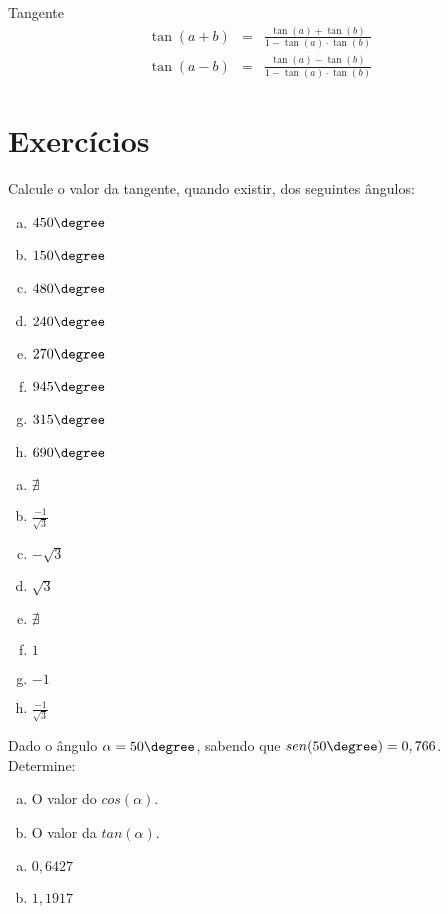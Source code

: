  Tangente
 \begin{eqnarray*}
  \tan(a+b)&=& \frac{\tan(a)+\tan(b)}{1-\tan(a)\cdot \tan(b)} \\
  \tan(a-b)&=& \frac{\tan(a)-\tan(b)}{1-\tan(a)\cdot \tan(b)}
 \end{eqnarray*}
 
\section{Exercícios}
\begin{exer}
 Calcule o valor da tangente, quando existir, dos seguintes ângulos:
 \begin{multicols}{2}
 \begin{enumerate}[a)]
 \item $450\degree$
 \item $150\degree$
 \item $480\degree$
 \item $240\degree$
 \item $270\degree$
 \item $945\degree$
 \item $315\degree$
 \item $690\degree$
 \end{enumerate}
 \end{multicols}
 \end{exer}
\begin{resp}
\begin{multicols}{4}
  \begin{enumerate}[a)]
 \item $\nexists$
 \item $\frac{-1}{\sqrt{3}}$
 \item $-\sqrt{3}$
 \item $\sqrt{3}$
 \item $\nexists$
 \item $1$
 \item $-1$
 \item $\frac{-1}{\sqrt{3}}$
 \end{enumerate}
 \end{multicols}
\end{resp}
  
 
 \begin{exer}
 Dado o ângulo $\alpha= 50\degree$, sabendo que $sen(50\degree)= 0,766$. Determine:
 \begin{enumerate}[a)]
 \item O valor do $cos(\alpha)$.
 \item O valor da $tan(\alpha)$.
 \end{enumerate}
 \end{exer}
\begin{resp}
\begin{multicols}{2}
  \begin{enumerate}[a)]
 \item $0,6427$
 \item $1,1917$
 \end{enumerate}
 \end{multicols}
\end{resp}

